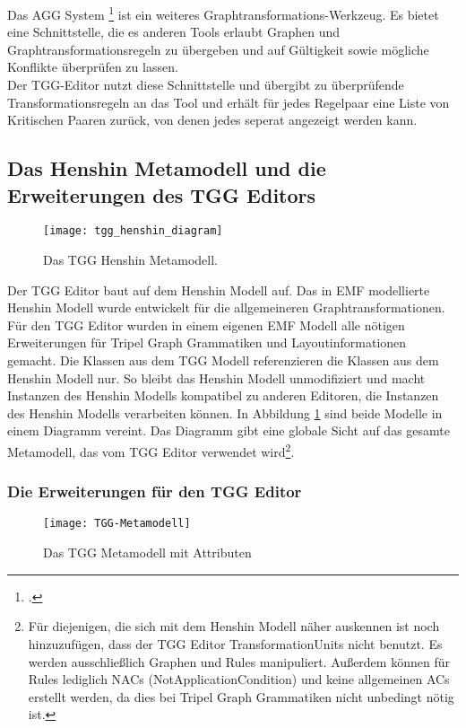 Das AGG System \footcite{AGG,RET12,Tae04} ist ein weiteres Graph\-trans\-forma\-tions-Werkzeug. Es bietet eine Schnittstelle, die es anderen Tools erlaubt Graphen und Graphtransformationsregeln zu übergeben und auf Gültigkeit sowie mögliche Konflikte überprüfen zu lassen.\\
Der TGG-Editor nutzt diese Schnittstelle und übergibt zu überprüfende Transformationsregeln an das Tool und erhält für jedes  Regelpaar eine Liste von Kritischen Paaren zurück, von denen jedes seperat angezeigt werden kann.

\subsection{Das Henshin Metamodell und die Erweiterungen des TGG
Editors}\label{sec:henshin_modell}
\begin{figure}[htbp]
	\centering %
	\texttt{[image: tgg\_henshin\_diagram]}
	\caption[TGG Henshin Metamodell]{Das TGG Henshin Metamodell.}
	\label{fig:tgg_henshin_diagram}
\end{figure}

Der TGG Editor baut auf dem Henshin Modell auf. Das in EMF modellierte Henshin Modell wurde entwickelt für die allgemeineren Graphtransformationen. Für den TGG Editor wurden in einem eigenen EMF Modell alle nötigen Erweiterungen für Tripel Graph Grammatiken und Layoutinformationen gemacht. Die Klassen aus dem TGG Modell referenzieren die Klassen aus dem Henshin Modell nur. So bleibt das Henshin Modell unmodifiziert und macht Instanzen des Henshin Modells kompatibel zu anderen Editoren, die Instanzen des Henshin Modells verarbeiten können. In Abbildung \ref{fig:tgg_henshin_diagram} sind beide Modelle in einem Diagramm vereint. Das Diagramm gibt eine globale Sicht auf das gesamte Metamodell, das vom TGG Editor verwendet wird\footnote{Für diejenigen, die sich mit dem Henshin Modell näher auskennen ist noch hinzuzufügen, dass der TGG Editor TransformationUnits nicht benutzt. Es werden ausschließlich Graphen und Rules manipuliert. Außerdem können für Rules lediglich NACs (NotApplicationCondition) und keine allgemeinen ACs erstellt werden, da dies bei Tripel Graph Grammatiken nicht unbedingt nötig ist.}.

\subsubsection{Die Erweiterungen für den TGG Editor}
\begin{figure}[htbp]
	\centering %
	\texttt{[image: TGG-Metamodell]}
	\caption[TGG Metamodell]{Das TGG Metamodell mit Attributen}
	\label{fig:tgg_diagram}
\end{figure}

